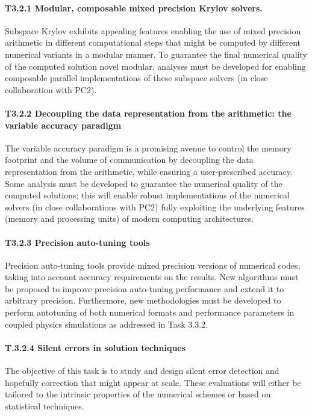 \paragraph*{T3.2.1 Modular, composable mixed precision Krylov solvers. }

Subspace Krylov exhibits appealing
features enabling the use of mixed precision arithmetic in different computational steps that might be
computed by different numerical variants in a modular manner. To guarantee the final numerical
quality of the computed solution novel modular, analyses must be developed for enabling composable
parallel implementations of these subspace solvers (in close collaboration with PC2).

\paragraph*{T3.2.2 Decoupling the data representation from the arithmetic: the variable accuracy paradigm}

The variable accuracy paradigm is a promising avenue to control the memory footprint and the
volume of communication by decoupling the data representation from the arithmetic, while ensuring a
user-prescribed accuracy. Some analysis must be developed to guarantee the numerical quality of the
computed solutions; this will enable robust implementations of the numerical solvers (in close
collaborations with PC2) fully exploiting the underlying features (memory and processing units) of
modern computing architectures.
\paragraph*{T3.2.3 Precision auto-tuning tools}
 Precision auto-tuning tools provide mixed precision versions of
numerical codes, taking into account accuracy requirements on the results. New algorithms must be
proposed to improve precision auto-tuning performance and extend it to arbitrary precision.
Furthermore, new methodologies must be developed to perform autotuning of both numerical formats
and performance parameters in coupled physics simulations as addressed in Task 3.3.2.
\paragraph*{T.3.2.4 Silent errors in solution techniques}
 The objective of this task is to study and design silent
error detection and hopefully correction that might appear at scale. These evaluations will either be
tailored to the intrinsic properties of the numerical schemes or based on statistical techniques.

